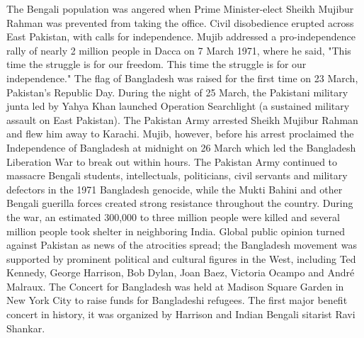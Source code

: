The Bengali population was angered when Prime Minister-elect Sheikh
Mujibur Rahman was prevented from taking the office. Civil disobedience
erupted across East Pakistan, with calls for independence. Mujib
addressed a pro-independence rally of nearly 2 million people in Dacca
on 7 March 1971, where he said, "This time the struggle is for our
freedom. This time the struggle is for our independence." The flag of
Bangladesh was raised for the first time on 23 March, Pakistan's
Republic Day. During the night of 25 March, the Pakistani military junta
led by Yahya Khan launched Operation Searchlight (a sustained military
assault on East Pakistan). The Pakistan Army arrested Sheikh Mujibur
Rahman and flew him away to Karachi. Mujib, however, before his arrest
proclaimed the Independence of Bangladesh at midnight on 26 March which
led the Bangladesh Liberation War to break out within hours. The
Pakistan Army continued to massacre Bengali students, intellectuals,
politicians, civil servants and military defectors in the 1971
Bangladesh genocide, while the Mukti Bahini and other Bengali guerilla
forces created strong resistance throughout the country. During the war,
an estimated 300,000 to three million people were killed and several
million people took shelter in neighboring India. Global public opinion
turned against Pakistan as news of the atrocities spread; the Bangladesh
movement was supported by prominent political and cultural figures in
the West, including Ted Kennedy, George Harrison, Bob Dylan, Joan Baez,
Victoria Ocampo and André Malraux. The Concert for Bangladesh was held
at Madison Square Garden in New York City to raise funds for Bangladeshi
refugees. The first major benefit concert in history, it was organized
by Harrison and Indian Bengali sitarist Ravi Shankar.

